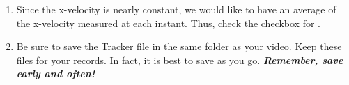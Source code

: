 \begin{enumerate}
	\item Since the x-velocity is nearly constant, we would like to have an average of the x-velocity measured at each instant. Thus, check the checkbox for .
	
	

	\item Be sure to save the Tracker file in the same folder as your video. Keep these files for your records. In fact, it is best to save as you go. {\bf \emph{Remember, save early and often!}}
	
\end{enumerate}

\report

